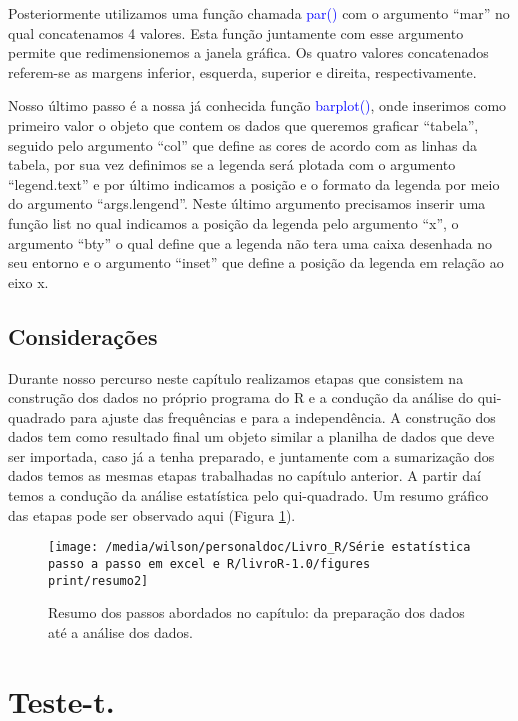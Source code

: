 \documentclass[14pt,titlepage, oneside, openany, a4paper]{book}
\begin{document}
Posteriormente utilizamos uma função chamada \textcolor{blue}{par()} com o argumento ``mar'' no qual concatenamos 4 valores. Esta função juntamente com esse argumento permite que redimensionemos a janela gráfica. Os quatro valores concatenados referem-se as margens inferior, esquerda, superior e direita, respectivamente.

Nosso último passo é a nossa já conhecida função \textcolor{blue}{barplot()}, onde inserimos como primeiro valor o objeto que contem os dados que queremos graficar ``tabela'', seguido pelo argumento ``col'' que define as cores de acordo com as linhas da tabela, por sua vez definimos se a legenda será plotada com o argumento ``legend.text'' e por último indicamos a posição e o formato da legenda por meio do argumento ``args.lengend''. Neste último argumento precisamos inserir uma função list no qual indicamos a posição da legenda pelo argumento ``x'', o argumento ``bty'' o qual define que a legenda não tera uma caixa desenhada no seu entorno e o argumento ``inset'' que define a posição da legenda em relação ao eixo x.

\hypertarget{considerauxe7uxf5es-1}{%
\section{Considerações}\label{considerauxe7uxf5es-1}}

Durante nosso percurso neste capítulo realizamos etapas que consistem na construção dos dados no próprio programa do R e a condução da análise do qui-quadrado para ajuste das frequências e para a independência. A construção dos dados tem como resultado final um objeto similar a planilha de dados que deve ser importada, caso já a tenha preparado, e juntamente com a sumarização dos dados temos as mesmas etapas trabalhadas no capítulo anterior. A partir daí temos a condução da análise estatística pelo qui-quadrado. Um resumo gráfico das etapas pode ser observado aqui (Figura \ref{fig:resumo2}).

\begin{figure}[H]
\texttt{[image: /media/wilson/personaldoc/Livro\_R/Série estatística passo a passo em excel e R/livroR-1.0/figures print/resumo2]} \caption{Resumo dos passos abordados no capítulo: da preparação dos dados até a análise dos dados.}\label{fig:resumo2}
\end{figure}

\hypertarget{teste-t.}{%
\chapter{Teste-t.}\label{teste-t.}}
\end{document}
